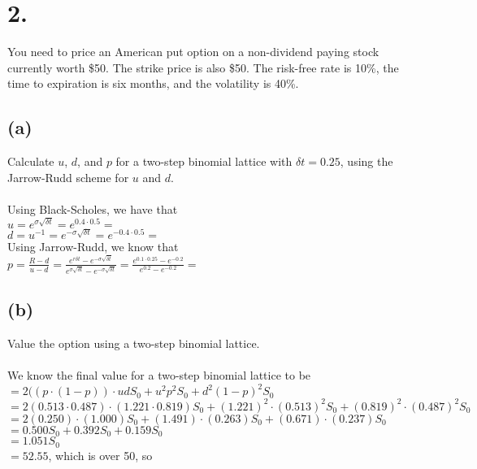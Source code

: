 \documentclass{article}
\begin{document}
\section*{2.}
{\Large

You need to price an American put option on a non-dividend paying stock currently worth \$50.  The strike price is also \$50.  The risk-free rate is 10\%, the time to expiration is six months, and the volatility is 40\%.



\subsection*{(a)}

Calculate $u$, $d$, and $p$ for a two-step binomial lattice with $\delta t = 0.25$, using the Jarrow-Rudd scheme for $u$ and $d$. \\ \\

Using Black-Scholes, we have that \\
$u = e^{\sigma \sqrt{\delta t}} = e^{0.4 \cdot 0.5} = $  \\
$d = u^{-1} = e^{-\sigma \sqrt{\delta t}} = e^{-0.4 \cdot 0.5} = $  \\
Using Jarrow-Rudd, we know that \\
$p = \frac{R - d}{u - d} = \frac{e^{r \delta t} - e^{-\sigma \sqrt{\delta t}}}{e^{\sigma \sqrt{\delta t}} - e^{-\sigma \sqrt{\delta t}}} = \frac{e^{0.1 \cdot 0.25} - e^{-0.2}}{e^{0.2} - e^{-0.2}} = $ 


\subsection*{(b)}

Value the option using a two-step binomial lattice. \\ \\

We know the final value for a two-step binomial lattice to be \\
$= 2((p \cdot (1-p)) \cdot ud S_0 + u^2 p^2 S_0 + d^2 (1-p)^2 S_0$ \\
$= 2( 0.513 \cdot  0.487) \cdot ( 1.221 \cdot  0.819) S_0 + ( 1.221)^2 \cdot ( 0.513)^2 S_0 + ( 0.819)^2 \cdot ( 0.487)^2 S_0$ \\
$= 2(0.250) \cdot (1.000) S_0 + (1.491) \cdot (0.263) S_0 + (0.671) \cdot (0.237) S_0$ \\
$= 0.500 S_0 + 0.392 S_0 + 0.159 S_0$ \\
$= 1.051 S_0$ \\
$= 52.55$, which is over 50, so \\

}
\end{document}
